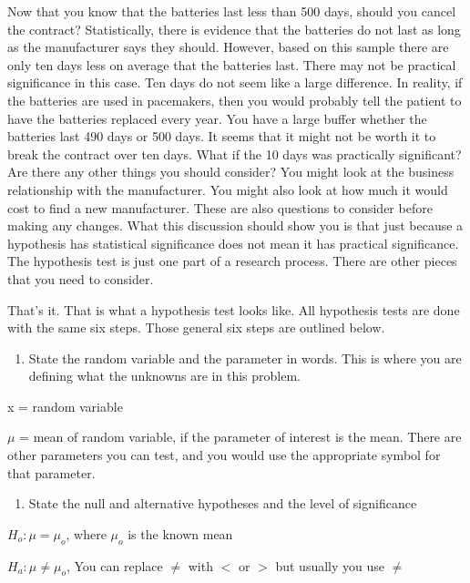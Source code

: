 \documentclass[
]{book}
\providecommand{\tightlist}{%
  \setlength{\itemsep}{0pt}\setlength{\parskip}{0pt}}
\begin{document}
Now that you know that the batteries last less than 500 days, should you cancel the contract? Statistically, there is evidence that the batteries do not last as long as the manufacturer says they should. However, based on this sample there are only ten days less on average that the batteries last. There may not be practical significance in this case. Ten days do not seem like a large difference. In reality, if the batteries are used in pacemakers, then you would probably tell the patient to have the batteries replaced every year. You have a large buffer whether the batteries last 490 days or 500 days. It seems that it might not be worth it to break the contract over ten days. What if the 10 days was practically significant? Are there any other things you should consider? You might look at the business relationship with the manufacturer. You might also look at how much it would cost to find a new manufacturer. These are also questions to consider before making any changes. What this discussion should show you is that just because a hypothesis has statistical significance does not mean it has practical significance. The hypothesis test is just one part of a research process. There are other pieces that you need to consider.

That's it. That is what a hypothesis test looks like. All hypothesis tests are done with the same six steps. Those general six steps are outlined below.

\begin{enumerate}
\def\labelenumi{\arabic{enumi}.}
\tightlist
\item
  State the random variable and the parameter in words. This is where
  you are defining what the unknowns are in this problem.
\end{enumerate}

x = random variable

\(\mu\) = mean of random variable, if the parameter of interest is the mean. There are other parameters you can test, and you would use the appropriate symbol for that parameter.

\begin{enumerate}
\def\labelenumi{\arabic{enumi}.}
\setcounter{enumi}{1}
\tightlist
\item
  State the null and alternative hypotheses and the level of
  significance
\end{enumerate}

\(H_o:\mu=\mu_o\), where \(\mu_o\) is the known mean

\(H_a:\mu\ne\mu_o\), You can replace \(\ne\) with \(<\) or \(>\) but usually you use \(\ne\)
\end{document}
